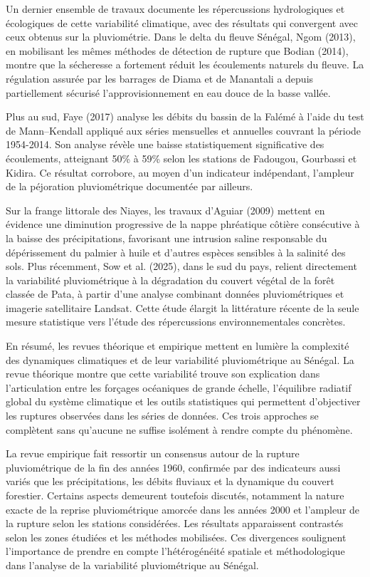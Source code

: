 Un dernier ensemble de travaux documente les répercussions hydrologiques et écologiques de cette variabilité climatique, avec des résultats qui convergent avec ceux obtenus sur la pluviométrie. Dans le delta du fleuve Sénégal, Ngom (2013), en mobilisant les mêmes méthodes de détection de rupture que Bodian (2014), montre que la sécheresse a fortement réduit les écoulements naturels du fleuve. La régulation assurée par les barrages de Diama et de Manantali a depuis partiellement sécurisé l’approvisionnement en eau douce de la basse vallée.

Plus au sud, Faye (2017) analyse les débits du bassin de la Falémé à l'aide du test de Mann--Kendall appliqué aux séries mensuelles et annuelles couvrant la période 1954-2014. Son analyse révèle une baisse statistiquement significative des écoulements, atteignant 50\% à 59\% selon les stations de Fadougou, Gourbassi et Kidira. Ce résultat corrobore, au moyen d'un indicateur indépendant, l'ampleur de la péjoration pluviométrique documentée par ailleurs.

Sur la frange littorale des Niayes, les travaux d'Aguiar (2009) mettent en évidence une diminution progressive de la nappe phréatique côtière consécutive à la baisse des précipitations, favorisant une intrusion saline responsable du dépérissement du palmier à huile et d'autres espèces sensibles à la salinité des sols. Plus récemment, Sow et al. (2025), dans le sud du pays, relient directement la variabilité pluviométrique à la dégradation du couvert végétal de la forêt classée de Pata, à partir d'une analyse combinant données pluviométriques et imagerie satellitaire Landsat. Cette étude élargit la littérature récente de la seule mesure statistique vers l'étude des répercussions environnementales concrètes.

\enlargethispage{5\baselineskip}
En résumé, les revues théorique et empirique mettent en lumière la complexité des dynamiques climatiques et de leur variabilité pluviométrique au Sénégal. La revue théorique montre que cette variabilité trouve son explication dans l'articulation entre les forçages océaniques de grande échelle, l'équilibre radiatif global du système climatique et les outils statistiques qui permettent d'objectiver les ruptures observées dans les séries de données. Ces trois approches se complètent sans qu'aucune ne suffise isolément à rendre compte du phénomène.

La revue empirique fait ressortir un consensus autour de la rupture pluviométrique de la fin des années 1960, confirmée par des indicateurs aussi variés que les précipitations, les débits fluviaux et la dynamique du couvert forestier. Certains aspects demeurent toutefois discutés, notamment la nature exacte de la reprise pluviométrique amorcée dans les années 2000 et l'ampleur de la rupture selon les stations considérées. Les résultats apparaissent contrastés selon les zones étudiées et les méthodes mobilisées. Ces divergences soulignent l'importance de prendre en compte l'hétérogénéité spatiale et méthodologique dans l'analyse de la variabilité pluviométrique au Sénégal.